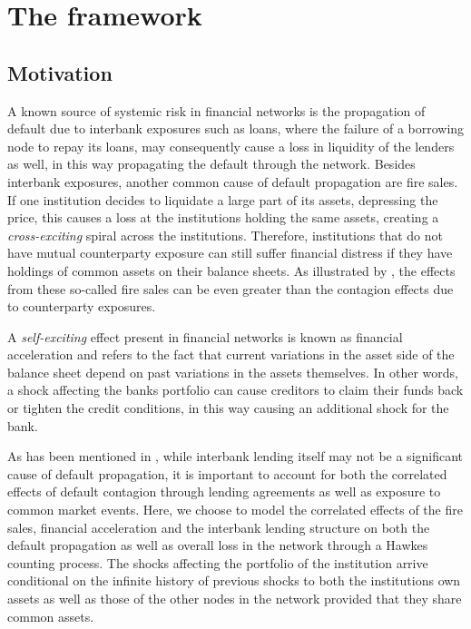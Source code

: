 \documentclass[10pt]{article}
\theoremstyle{plain}
\theoremstyle{definition}
\newcommand{\<}{\langle}
\renewcommand{\>}{\rangle}
\renewcommand{\(}{\left(}
\renewcommand{\)}{\right)}
\renewcommand{\[}{\left[}
\renewcommand{\]}{\right]}
\begin{document}
\section{The framework}\label{sec2}
\subsection{Motivation}
A known source of systemic risk in financial networks is the propagation of default due to interbank exposures such as loans, where the failure of a borrowing node to repay its loans, may consequently cause a loss in liquidity of the lenders as well, in this way propagating the default through the network. Besides interbank exposures, another common cause of default propagation are fire sales. If one institution decides to liquidate a large part of its assets, depressing the price, this causes a loss at the institutions holding the same assets, creating a \emph{cross-exciting} spiral across the institutions. Therefore, institutions that do not have mutual counterparty exposure can still suffer financial distress if they have holdings of common assets on their balance sheets. As illustrated by \citet{glasserman15}, the effects from these so-called fire sales can be even greater than the contagion effects due to counterparty exposures.

A \emph{self-exciting} effect present in financial networks is known as financial acceleration and refers to the fact that current variations in the asset side of the balance sheet depend on past variations in the assets themselves. In other words, a shock affecting the banks portfolio can cause creditors to claim their funds back or tighten the credit conditions, in this way causing an additional shock for the bank. %

As has been mentioned in \citet{cont10}, while interbank lending itself may not be a significant cause of default propagation, it is important to account for both the correlated effects of default contagion through lending agreements as well as exposure to common market events. Here, we choose to model the correlated effects of the fire sales, financial acceleration and the interbank lending structure on both the default propagation as well as overall loss in the network through a Hawkes counting process. The shocks affecting the portfolio of the institution arrive conditional on the infinite history of previous shocks to both the institutions own assets as well as those of the other nodes in the network provided that they share common assets.
\end{document}
